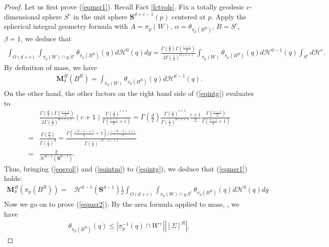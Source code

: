 \documentclass[11pt,a4paper]{amsart}
\numberwithin{equation}{section}
\newcommand{\ai}{\alpha}
\newcommand{\Ga}{\Gamma}
\newcommand{\de}{\delta}
\newcommand{\hm}{\mathcal{H}}
\newcommand{\Si}{\Sigma}
\newcommand{\ms}{\mathbf{M}}
\newcommand{\m}{^{-1}}
\theoremstyle{plain}
\theoremstyle{definition}
\numberwithin{equation}{subsection}
\begin{document}
\begin{proof}
	Let us first prove (\ref{eqmsr1}).	Recall Fact \ref{fctvols}.	Fix a totally geodesic $c$-dimensional sphere $S^c$ in the unit sphere $\mathbf{S}^{d+c-1}(p)$ centered at $p$.	Apply the spherical integral geometry formula \cite[3.2.48 Theorem]{HF} with $A= \pi_p(W)$, $\ai=\theta_{\pi_p\left( B^R\right)}$, $B=S^c$, $\beta=1$, we deduce that
	\begin{align}
		\label{eqintg}\int_{O(d+c)}\int_{\pi_p(W)\cap g.S^c}\theta_{\pi_p\left( B^R\right)}(q)d\mathcal{H}^0(q) dg=\frac{\Gamma\left(\frac{d}{2}\right)\Ga\left(\frac{c+1}{2}\right)}{2\Ga\left(\frac{1}{2}\right)^{d+c+1}}\int_{\pi_p(W)}\theta_{\pi_p\left( B^R\right)}(q)d\mathcal{H}^{d-1}(q)\int_{S^c}d\mathcal{H}^{c}.
	\end{align}
	By definition of mass, we have	\begin{align}\label{eqintm}
		\ms^R_\de\left( B^R\right)=\int_{\pi_p(W)}\theta_{\pi_p\left( B^R\right)}(q)d\mathcal{H}^{d-1}(q).
	\end{align}
	On the other hand, the other factors on the right hand side of (\ref{eqintg}) evaluates to 	\begin{align}
		&\frac{\Gamma\left(\frac{d}{2}\right)\Ga\left(\frac{c+1}{2}\right)}{2\Ga\left(\frac{1}{2}\right)^{d+c+1}}(c+1)\frac{\Ga\left(\frac{1}{2}\right)^{c+1}}{\Ga\left(\frac{c+1}{2}+1\right)}
		=\Gamma\left(\frac{d}{2}\right)\frac{\Ga\left(\frac{1}{2}\right)^{c+1}}{\Ga\left(\frac{1}{2}\right)^{d+c+1}}\frac{c+1}{2}\frac{\Ga\left(\frac{c+1}{2}\right)}{\Ga\left(\frac{c+1}{2}+1\right)}\\
		=&\frac{\Gamma\left(\frac{d}{2}\right)}{\Ga\left(\frac{1}{2}\right)^{d}}=\frac{\Ga\left(\frac{(d-1)+1}{2}+1\right)/\frac{((d-1)+1)}{2}}{\Ga\left(\frac{1}{2}\right)^{(d-1)+1}}\\=&\frac{2}{\hm^{d-1}(\mathbf{S}^{d-1})}.\label{eqsvol}
	\end{align}
	Thus, bringing (\ref{eqsvol}) and (\ref{eqintm}) to (\ref{eqintg}), we deduce that (\ref{eqmsr1}) holds:
	\begin{align}\label{eqmst}
		\ms^R_\de(\pi_p\left( B^R\right))
		=&\hm^{d-1}(\mathbf{S}^{d-1})\frac{1}{2}\int_{O(d+c)}\int_{\pi_p(W)\cap g.S^c}\theta_{\pi_p\left( B^R\right)}(q)d\mathcal{H}^0(q) dg
	\end{align}	
	Now we go on to prove (\ref{eqmsr2}). By the area formula applied to mass, \cite[27.2 Remarks (3)]{LS}, we have
	\begin{align*}\label{eqdsts}
		\theta_{\pi_p\left( B^R\right)}(q)\le |\pi_p\m(q)\cap W^+|\left|[\Si]^R\right|,

\end{align*}
\end{proof}
\end{document}
